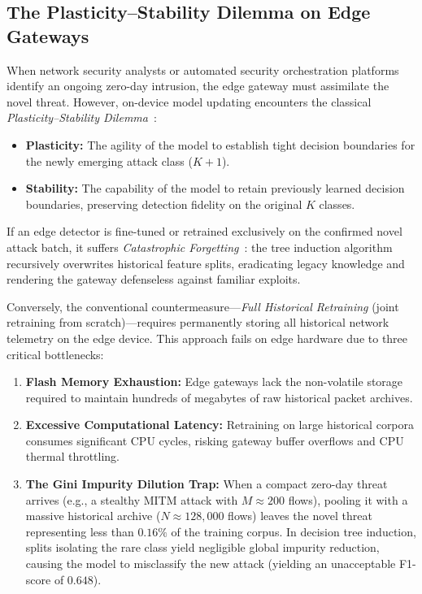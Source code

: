 \documentclass[conference]{IEEEtran}
\begin{document}
\subsection{The Plasticity--Stability Dilemma on Edge Gateways}
When network security analysts or automated security orchestration platforms identify an ongoing zero-day intrusion, the edge gateway must assimilate the novel threat. However, on-device model updating encounters the classical \emph{Plasticity--Stability Dilemma}~\cite{de2021continual}:
\begin{itemize}
    \item \textbf{Plasticity:} The agility of the model to establish tight decision boundaries for the newly emerging attack class ($K+1$).
    \item \textbf{Stability:} The capability of the model to retain previously learned decision boundaries, preserving detection fidelity on the original $K$ classes.
\end{itemize}

If an edge detector is fine-tuned or retrained exclusively on the confirmed novel attack batch, it suffers \emph{Catastrophic Forgetting}~\cite{kirkpatrick2017overcoming}: the tree induction algorithm recursively overwrites historical feature splits, eradicating legacy knowledge and rendering the gateway defenseless against familiar exploits.

Conversely, the conventional countermeasure—\emph{Full Historical Retraining} (joint retraining from scratch)—requires permanently storing all historical network telemetry on the edge device. This approach fails on edge hardware due to three critical bottlenecks:
\begin{enumerate}
    \item \textbf{Flash Memory Exhaustion:} Edge gateways lack the non-volatile storage required to maintain hundreds of megabytes of raw historical packet archives.
    \item \textbf{Excessive Computational Latency:} Retraining on large historical corpora consumes significant CPU cycles, risking gateway buffer overflows and CPU thermal throttling.
    \item \textbf{The Gini Impurity Dilution Trap:} When a compact zero-day threat arrives (e.g., a stealthy MITM attack with $M \approx 200$ flows), pooling it with a massive historical archive ($N \approx 128{,}000$ flows) leaves the novel threat representing less than $0.16\%$ of the training corpus. In decision tree induction, splits isolating the rare class yield negligible global impurity reduction, causing the model to misclassify the new attack (yielding an unacceptable F1-score of $0.648$).
\end{enumerate}
\end{document}
